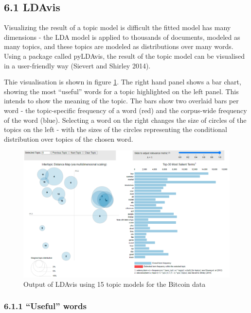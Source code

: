 \documentclass[
]{article}
\begin{document}
\hypertarget{ldavis}{%
\subsection{6.1 LDAvis}\label{ldavis}}

Visualizing the result of a topic model is difficult the fitted model
has many dimensions - the LDA model is applied to thousands of
documents, modeled as many topics, and these topics are modeled as
distributions over many words. Using a package called pyLDAvis, the
result of the topic model can be visualised in a user-friendly way
(Sievert and Shirley 2014).

Thie visualisation is shown in figure \ref{fig:ldavis1}. The right hand
panel shows a bar chart, showing the most ``useful'' words for a topic
highlighted on the left panel. This intends to show the meaning of the
topic. The bars show two overlaid bars per word - the topic-specific
frequency of a word (red) and the corpus-wide frequency of the word
(blue). Selecting a word on the right changes the size of circles of the
topics on the left - with the sizes of the circles representing the
conditional distribution over topics of the chosen word.

\begin{figure}

{\centering \includegraphics[width=1\linewidth]{images/ldavis1} 

}

\caption{Output of LDAvis using 15 topic models for the Bitcoin data}\label{fig:ldavis1}
\end{figure}

\hypertarget{useful-words}{%
\subsubsection{6.1.1 ``Useful'' words}\label{useful-words}}
\end{document}
